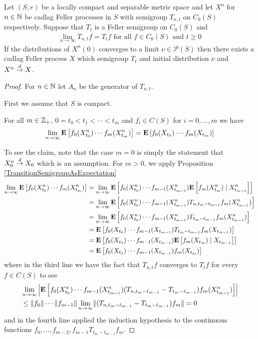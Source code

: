 \begin{thm}\label{KurtzMackevicius}Let $(S,r)$ be a locally compact and separable metric space and let $X^n$ for $n \in \naturals$ be
cadlag Feller processes in $S$ with semigroup $T_{n,t}$ on $C_0(S)$ respectively.  Suppose that $T_t$ is a Feller semigroup on $C_0(S)$ and
\begin{align*}
\lim_{n \to \infty} T_{n,t} f = T_t f \text{ for all $f \in C_0(S)$ and $t \geq 0$}
\end{align*}
If the distributions of $X^n(0)$ converges to a limit $\nu \in \mathcal{P}(S)$ then there exists a cadlag Feller process $X$ which semigroup
$T_t$ and initial distribution $\nu$ and $X^n \todist X$.
\end{thm} 
\begin{proof}
For $n \in \naturals$ let $A_n$ be the generator of $T_{n,t}$.

First we assume that $S$ is compact.  

\begin{clm} For all $m \in \integers_+$, $0=t_0 < t_1 < \dotsb < t_m$ and $f_i \in C(S)$ for $i=0, \dotsc, m$ we have
\begin{align*}
\lim_{n \to \infty} \expectation{f_0(X^n_{t_0}) \dotsb f_m(X^n_{t_m})} = \expectation{f_0(X_{t_0}) \dotsb f_{m}(X_{t_{m}})}
\end{align*}
\end{clm}
To see the claim, note that the case $m=0$ is simply the statement that $X^n_0 \todist X_0$ which is an assumption.  For $m > 0$, 
we apply Proposition \ref{TransitionSemigroupAsExpectation}
\begin{align*}
\lim_{n \to \infty} \expectation{f_0(X^n_{t_0}) \dotsb f_m(X^n_{t_m})} 
&=\lim_{n \to \infty} \expectation{f_0(X^n_{t_0}) \dotsb f_{m-1}(X^n_{t_{m-1}}) \cexpectationlong{X^n_{t_{m-1}}}{f_m(X^n_{t_m})}} \\
&=\lim_{n \to \infty} \expectation{f_0(X^n_{t_0}) \dotsb f_{m-1}(X^n_{t_{m-1}}) T_{n,t_m-t_{m-1}} f_m(X^n_{t_{m-1}})}\\
&=\lim_{n \to \infty} \expectation{f_0(X^n_{t_0}) \dotsb f_{m-1}(X^n_{t_{m-1}}) T_{t_m-t_{m-1}} f_m(X^n_{t_{m-1}})}\\
&=\expectation{f_0(X_{t_0}) \dotsb f_{m-1}(X_{t_{m-1}}) T_{t_m-t_{m-1}} f_m(X_{t_{m-1}})}\\
&=\expectation{f_0(X_{t_0}) \dotsb f_{m-1}(X_{t_{m-1}}) \cexpectationlong{X_{t_{m-1}}}{f_m(X_{t_{m}})}}\\
&=\expectation{f_0(X_{t_0}) \dotsb f_{m-1}(X_{t_{m-1}}) f_m(X_{t_{m}})}\\
\end{align*}
where in the third line we have the fact that $T_{n,t} f$ converges to $T_t f$  for every $f \in C(S)$ to see
\begin{align*}
&\lim_{n \to \infty} \abs{\expectation{f_0(X^n_{t_0}) \dotsb f_{m-1}(X^n_{t_{m-1}}) (T_{n,t_m - t_{m-1}} - T_{t_m-t_{m-1}}) f_m(X^n_{t_{m-1}})}}  \\
&\leq \norm{f_0} \dotsb \norm{f_{m-1}} \lim_{n \to \infty} \norm{(T_{n,t_m - t_{m-1}} - T_{t_m-t_{m-1}}) f_m} = 0
\end{align*}
and in the fourth line applied the induction hypothesis to the continuous functions $f_0, \dotsc, f_{m-2}, f_{m-1} T_{t_m-t_{m-1}} f_m$.


\end{proof}
